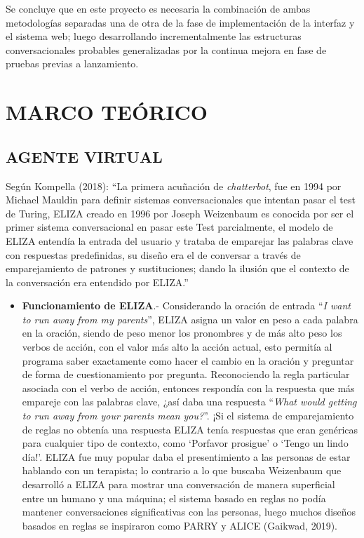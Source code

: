 \documentclass[letter, openright, 12pt]{book}
\begin{document}
Se concluye que en este proyecto es necesaria la combinación de ambas metodologías separadas una de otra de la fase de implementación de la interfaz y el sistema web; luego desarrollando incrementalmente las estructuras conversacionales probables generalizadas por la continua mejora en fase de pruebas previas a lanzamiento. 


\chapter{MARCO TEÓRICO}

\section{AGENTE VIRTUAL}
Según Kompella (2018): “La primera acuñación de \textit{chatterbot}, fue en 1994 por Michael Mauldin para definir sistemas conversacionales que intentan pasar el test de Turing, ELIZA creado en 1996 por Joseph Weizenbaum es conocida por ser el primer sistema conversacional en pasar  este Test parcialmente, el modelo de ELIZA entendía la entrada del usuario y trataba de emparejar las palabras clave con respuestas predefinidas, su diseño era el de conversar a través de emparejamiento de patrones y sustituciones; dando la ilusión que el contexto de la conversación era entendido por ELIZA.”

\begin{itemize}
\item \textbf{Funcionamiento de ELIZA}.- Considerando la oración de entrada “\textit{I want to run away from my parents}”, ELIZA asigna un valor en peso a cada palabra en la oración, siendo de peso menor los pronombres y de más alto peso los verbos de acción, con el valor más alto la acción actual, esto permitía al programa saber exactamente como hacer el cambio en la oración y preguntar de forma de cuestionamiento por pregunta. Reconociendo la regla particular asociada con el verbo de acción, entonces respondía con la respuesta que más empareje con las palabras clave, ¿así daba una respuesta “\textit{What would getting to run away from your parents mean you?}”. ¡Si el sistema de emparejamiento de reglas no obtenía una respuesta ELIZA tenía respuestas que eran genéricas para cualquier tipo de contexto, como ‘Porfavor prosigue’ o ‘Tengo un lindo día!’. ELIZA fue muy popular daba el presentimiento a las personas de estar hablando con un terapista; lo contrario a lo que buscaba Weizenbaum que desarrolló a ELIZA para mostrar una conversación de manera superficial entre un humano y una máquina; el sistema basado en reglas no podía mantener conversaciones significativas con las personas, luego muchos diseños basados en reglas se inspiraron como PARRY y ALICE (Gaikwad, 2019).
\end{itemize}
\end{document}
